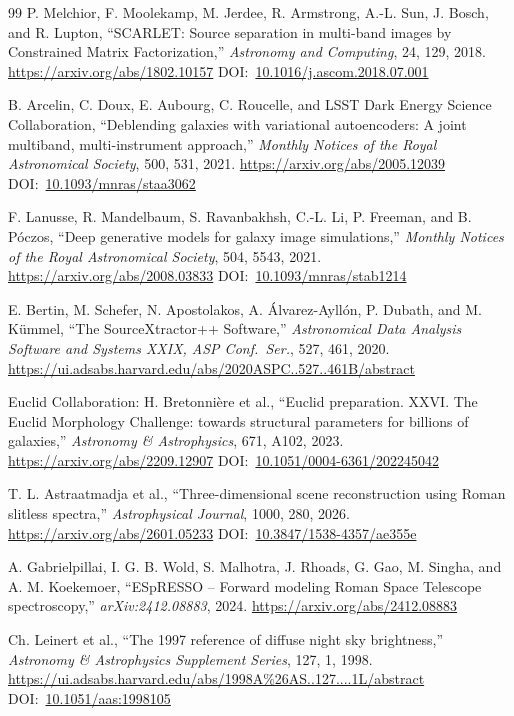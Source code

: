 \documentclass[10pt,onecolumn]{article}
\newcommand{\doi}[1]{DOI:~\href{https://doi.org/#1}{#1}}
\begin{document}
\begin{thebibliography}{99}
P. Melchior, F. Moolekamp, M. Jerdee, R. Armstrong, A.-L. Sun, J. Bosch, and R. Lupton,
``SCARLET: Source separation in multi-band images by Constrained Matrix Factorization,''
\emph{Astronomy and Computing}, 24, 129, 2018.
\url{https://arxiv.org/abs/1802.10157}
\doi{10.1016/j.ascom.2018.07.001}

B. Arcelin, C. Doux, E. Aubourg, C. Roucelle, and LSST Dark Energy Science Collaboration,
``Deblending galaxies with variational autoencoders: A joint multiband, multi-instrument approach,''
\emph{Monthly Notices of the Royal Astronomical Society}, 500, 531, 2021.
\url{https://arxiv.org/abs/2005.12039}
\doi{10.1093/mnras/staa3062}

F. Lanusse, R. Mandelbaum, S. Ravanbakhsh, C.-L. Li, P. Freeman, and B. P\'oczos,
``Deep generative models for galaxy image simulations,''
\emph{Monthly Notices of the Royal Astronomical Society}, 504, 5543, 2021.
\url{https://arxiv.org/abs/2008.03833}
\doi{10.1093/mnras/stab1214}

E. Bertin, M. Schefer, N. Apostolakos, A. Álvarez-Ayllón, P. Dubath, and M. Kümmel,
``The SourceXtractor++ Software,''
\emph{Astronomical Data Analysis Software and Systems XXIX, ASP Conf.\ Ser.}, 527, 461, 2020.
\url{https://ui.adsabs.harvard.edu/abs/2020ASPC..527..461B/abstract}

Euclid Collaboration: H. Bretonni\`ere et al.,
``Euclid preparation. XXVI. The Euclid Morphology Challenge: towards structural parameters for billions of galaxies,''
\emph{Astronomy \& Astrophysics}, 671, A102, 2023.
\url{https://arxiv.org/abs/2209.12907}
\doi{10.1051/0004-6361/202245042}

T. L. Astraatmadja et al.,
``Three-dimensional scene reconstruction using Roman slitless spectra,''
\emph{Astrophysical Journal}, 1000, 280, 2026.
\url{https://arxiv.org/abs/2601.05233}
\doi{10.3847/1538-4357/ae355e}

A. Gabrielpillai, I. G. B. Wold, S. Malhotra, J. Rhoads, G. Gao, M. Singha, and A. M. Koekemoer,
``ESpRESSO -- Forward modeling Roman Space Telescope spectroscopy,''
\emph{arXiv:2412.08883}, 2024.
\url{https://arxiv.org/abs/2412.08883}

Ch. Leinert et al.,
``The 1997 reference of diffuse night sky brightness,''
\emph{Astronomy \& Astrophysics Supplement Series}, 127, 1, 1998.
\url{https://ui.adsabs.harvard.edu/abs/1998A\%26AS..127....1L/abstract}
\doi{10.1051/aas:1998105}


\end{thebibliography}
\end{document}

